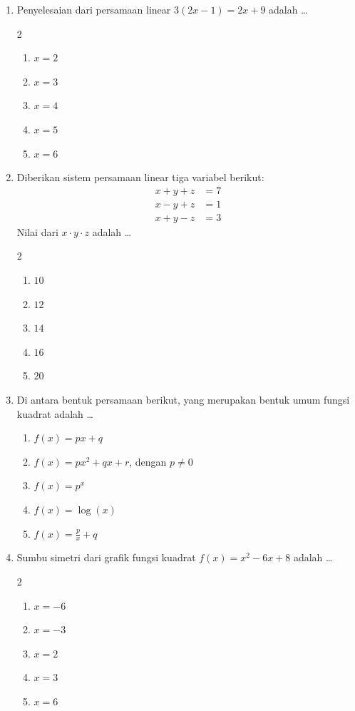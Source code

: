 \documentclass[12pt,a4paper]{article}
\begin{document}
\begin{enumerate}[itemsep=2ex]
    \item Penyelesaian dari persamaan linear $3(2x - 1) = 2x + 9$ adalah \dots
    \begin{multicols}{2}
    \begin{enumerate}[label=\Alph*.]
        \item $x = 2$
        \item $x = 3$
        \item $x = 4$
        \item $x = 5$
        \item $x = 6$
    \end{enumerate}
    \end{multicols}

    \item Diberikan sistem persamaan linear tiga variabel berikut:
    \begin{align*}
        x + y + z &= 7 \\
        x - y + z &= 1 \\
        x + y - z &= 3
    \end{align*}
    Nilai dari $x \cdot y \cdot z$ adalah \dots
    \begin{multicols}{2}
    \begin{enumerate}[label=\Alph*.]
        \item $10$
        \item $12$
        \item $14$
        \item $16$
        \item $20$
    \end{enumerate}
    \end{multicols}

    \item Di antara bentuk persamaan berikut, yang merupakan bentuk umum fungsi kuadrat adalah \dots
    \begin{enumerate}[label=\Alph*.]
        \item $f(x) = px + q$
        \item $f(x) = px^2 + qx + r$, dengan $p \neq 0$
        \item $f(x) = p^x$
        \item $f(x) = \log(x)$
        \item $f(x) = \frac{p}{x} + q$
    \end{enumerate}

    \item Sumbu simetri dari grafik fungsi kuadrat $f(x) = x^2 - 6x + 8$ adalah \dots
    \begin{multicols}{2}
    \begin{enumerate}[label=\Alph*.]
        \item $x = -6$
        \item $x = -3$
        \item $x = 2$
        \item $x = 3$
        \item $x = 6$
    \end{enumerate}
    \end{multicols}


\end{enumerate}
\end{document}
